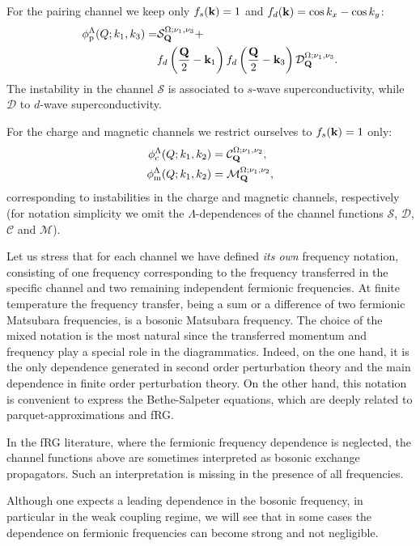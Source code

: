 For the pairing channel we keep only $f_{s}(\mathbf{k}) = 1$ and $f_d(\mathbf{k})=\cos{k_x} - \cos{k_y}$:
\begin{align}
\nonumber
  \phi^{\Lambda}_{\mathrm{p}}(Q;k_1,k_3) =&
    \mathcal{S}_{\mathbf{Q}}^{\Omega;\nu_1,\nu_3} +   \\ 
    & f_d\left(\frac{\mathbf{Q}}{2}-\mathbf{k}_1\right) f_d\left(\frac{\mathbf{Q}}{2}-\mathbf{k}_3\right) \mathcal{D}_{\mathbf{Q}}^{\Omega;\nu_1,\nu_3}.
\end{align}
The instability in the channel $\mathcal{S}$ is associated to $s$-wave superconductivity, while $\mathcal{D}$  to $d$-wave superconductivity.

For the charge and magnetic channels we restrict ourselves to $f_{s}(\mathbf{k})=1$ only:
\begin{align}
  \phi^\Lambda_{\mathrm{c}}(Q;k_1,k_2) &= \mathcal{C}_{\mathbf{Q}}^{\Omega;\nu_1,\nu_2}, \\
  \phi^\Lambda_{\mathrm{m}}(Q;k_1,k_2) &= \mathcal{M}_{\mathbf{Q}}^{\Omega;\nu_1,\nu_2},
\end{align}
corresponding to instabilities in the charge and magnetic channels, respectively (for notation simplicity we omit 
the $\Lambda$-dependences of the channel functions $\mathcal{S}$, $\mathcal{D}$, $\mathcal{C}$ and $\mathcal{M}$).

Let us stress that for each channel we have defined \textit{its own} frequency notation, consisting of one frequency corresponding to the frequency transferred in the specific channel 
and two remaining independent fermionic frequencies. At finite temperature the frequency transfer, being a sum or a difference of 
two fermionic Matsubara frequencies, is a bosonic Matsubara frequency.
The choice of the mixed notation is the most natural\cite{Wentzell2017} since the transferred momentum and 
frequency play a special role in the diagrammatics.
Indeed, on the one hand, it is the only dependence generated in second order perturbation theory and the main dependence in finite 
order perturbation theory. On the other hand, this notation is convenient to express the Bethe-Salpeter equations\cite{Rohringer2012}, which are deeply related to parquet-approximations and fRG. 

In the fRG literature\cite{Husemann2009,Husemann2012,Giering2012}, where the fermionic frequency dependence is neglected, the channel functions above are sometimes interpreted as bosonic exchange propagators. Such an interpretation is missing in the presence of all frequencies.

Although one expects a leading dependence in the bosonic frequency, 
in particular in the weak coupling regime, we will see that in some cases the dependence on fermionic frequencies can become strong and not negligible.

